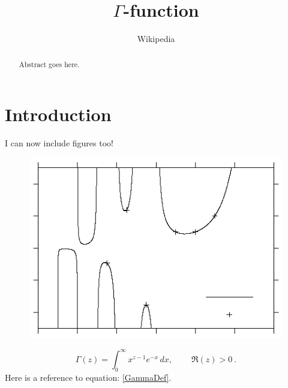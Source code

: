 \documentclass[twocolumn,a4paper]{article}
\begin{document}
\title{$\Gamma$-function}
\author{Wikipedia}
\maketitle
\begin{abstract}
Abstract goes here.
\end{abstract}

\section{Introduction}
I can now include figures too!
\begin{figure}[b]
	\includegraphics{gamma_gnuplot}
\end{figure}

\begin{equation}\label{GammaDef}
	\Gamma(z) = \int_0^\infty x^{z-1} e^{-x}\,dx, \ \qquad \Re(z) > 0\ .
\end{equation}
Here is a reference to equation: \ref{GammaDef}. \\
\end{document}
